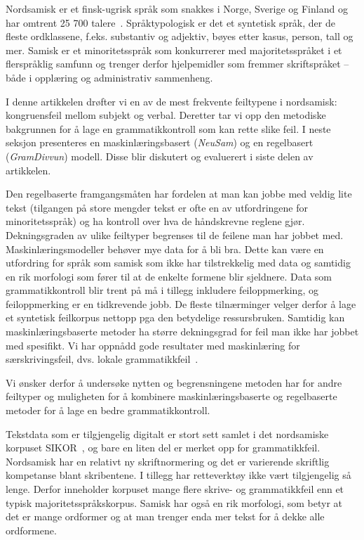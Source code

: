 \documentclass{flammie}
\begin{document}
Nordsamisk er et finsk-ugrisk språk som snakkes i Norge, Sverige og Finland og
har omtrent 25 700 talere~\cite{Ethnologue2018}.  Språktypologisk er det et
syntetisk språk, der de fleste ordklassene, f.eks. substantiv og adjektiv, bøyes
etter kasus, person, tall og mer.  Samisk er et minoritetsspråk som konkurrerer
med majoritetsspråket i et flerspråklig samfunn og trenger derfor hjelpemidler
som fremmer skriftspråket -- både i opplæring og administrativ sammenheng.

I denne artikkelen drøfter vi en av de mest frekvente feiltypene i nordsamisk:
kongruensfeil mellom subjekt og verbal.  Deretter tar vi opp den metodiske
bakgrunnen for å lage en grammatikkontroll som kan rette slike feil.  I neste
seksjon presenteres en maskinlæringsbasert (\textit{NeuSam}) og en regelbasert
(\textit{GramDivvun}) modell.  Disse blir diskutert og evaluerert i siste delen
av artikkelen.

Den regelbaserte framgangsmåten har fordelen at man kan jobbe med veldig lite
tekst (tilgangen på store mengder tekst er ofte en av utfordringene for
minoritetsspråk) og ha kontroll over hva de håndskrevne reglene gjør.
Dekningsgraden av ulike feiltyper begrenses til de feilene man har jobbet med.
Maskinlæringsmodeller behøver mye data for å bli bra. Dette kan være en
utfordring for språk som samisk som ikke har tilstrekkelig med data og samtidig
en rik morfologi som fører til at de enkelte formene blir sjeldnere.  Data som
grammatikkontroll blir trent på må i tillegg inkludere feiloppmerking, og
feiloppmerking er en tidkrevende jobb. De fleste tilnærminger velger derfor å
lage et syntetisk feilkorpus nettopp pga den betydelige ressursbruken.
\cite{Milkowski2007,dahlmeier-etal-2013-building} Samtidig kan
maskinlæringsbaserte metoder ha større dekningsgrad for feil man ikke har jobbet
med spesifikt. Vi har oppnådd gode resultater med maskinlæring for
særskrivingsfeil, dvs. lokale grammatikkfeil~\cite{Wiechetek2021}.

Vi ønsker derfor å undersøke nytten og begrensningene metoden har for andre
feiltyper og muligheten for å  kombinere maskinlæringsbaserte og regelbaserte
metoder for å lage en bedre grammatikkontroll.


Tekstdata som er tilgjengelig digitalt er stort sett samlet i det nordsamiske
korpuset SIKOR~\cite{sikor_06.11.2018}, og bare en liten del er merket opp for
grammatikkfeil.  Nordsamisk har en relativt ny skriftnormering og det er
varierende skriftlig kompetanse blant skribentene. I tillegg har retteverktøy
ikke vært tilgjengelig så lenge. Derfor inneholder korpuset mange flere skrive-
og grammatikkfeil enn et typisk majoritetsspråkskorpus.  Samisk har også en rik
morfologi, som betyr at det er mange ordformer og at man trenger enda mer tekst
for å dekke alle ordformene.
\end{document}

